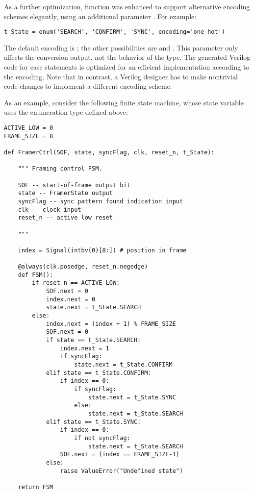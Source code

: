 As a further optimization, function  was enhanced to support
alternative encoding schemes elegantly, using an additional parameter
. For example:

\begin{verbatim}
t_State = enum('SEARCH', 'CONFIRM', 'SYNC', encoding='one_hot')
\end{verbatim}

The default encoding is ; the other possibilities are
 and . This parameter only affects
the conversion output, not the behavior of the type.  The generated
Verilog code for case statements is optimized for an efficient
implementation according to the encoding. Note that in contrast, a
Verilog designer has to make nontrivial code changes to implement a
different encoding scheme.

As an example, consider the following finite state machine, whose
state variable uses the enumeration type defined above:

\begin{verbatim}
ACTIVE_LOW = 0
FRAME_SIZE = 8

def FramerCtrl(SOF, state, syncFlag, clk, reset_n, t_State):
    
    """ Framing control FSM.

    SOF -- start-of-frame output bit
    state -- FramerState output
    syncFlag -- sync pattern found indication input
    clk -- clock input
    reset_n -- active low reset
    
    """
    
    index = Signal(intbv(0)[8:]) # position in frame

    @always(clk.posedge, reset_n.negedge)
    def FSM():
        if reset_n == ACTIVE_LOW:
            SOF.next = 0
            index.next = 0
            state.next = t_State.SEARCH
        else:
            index.next = (index + 1) % FRAME_SIZE
            SOF.next = 0
            if state == t_State.SEARCH:
                index.next = 1
                if syncFlag:
                    state.next = t_State.CONFIRM
            elif state == t_State.CONFIRM:
                if index == 0:
                    if syncFlag:
                        state.next = t_State.SYNC
                    else:
                        state.next = t_State.SEARCH
            elif state == t_State.SYNC:
                if index == 0:
                    if not syncFlag:
                        state.next = t_State.SEARCH
                SOF.next = (index == FRAME_SIZE-1)
            else:
                raise ValueError("Undefined state")
            
    return FSM
\end{verbatim}

